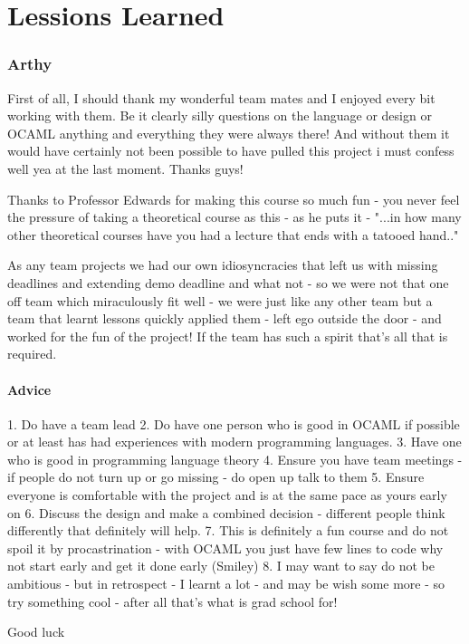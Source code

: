 \section{Lessions Learned}
\subsubsection*{Arthy}
First of all, I should thank my wonderful team mates and I enjoyed every bit working with them. Be it clearly silly
questions on the language or design or OCAML anything and everything they were always there! And without them it would
have certainly not been possible to have pulled this project i must confess well yea at the last moment. Thanks guys!

Thanks to Professor Edwards for making this course so much fun - you never feel the pressure of taking a theoretical course as this - as he puts it - "...in how many other theoretical courses have you had a lecture that ends with a tatooed hand.." 

As any team projects we had our own idiosyncracies that left us with missing deadlines and extending demo deadline and what not - so we were not that one off team which miraculously fit well - we were just like any other team but a team that learnt lessons quickly applied them - left ego outside the door - and worked for the fun of the project! If the team has such a spirit that's all that is required.

\paragraph{Advice}
1. Do have a team lead 
2. Do have one person who is good in OCAML if possible or at least has had experiences with modern programming languages.
3. Have one who is good in programming language theory 
4. Ensure you have team meetings - if people do not turn up or go missing - do open up talk to them 
5. Ensure everyone is comfortable with the project and is at the same pace as yours early on
6. Discuss the design and make a combined decision - different people think differently that definitely will help.
7. This is definitely a fun course and do not spoil it by procastrination - with OCAML you just have few lines to 
code why not start early and get it done early (Smiley)
8. I may want to say do not be ambitious - but in retrospect - I learnt a lot - and may be wish some more - so 
try something cool - after all that's what is grad school for!

Good luck

